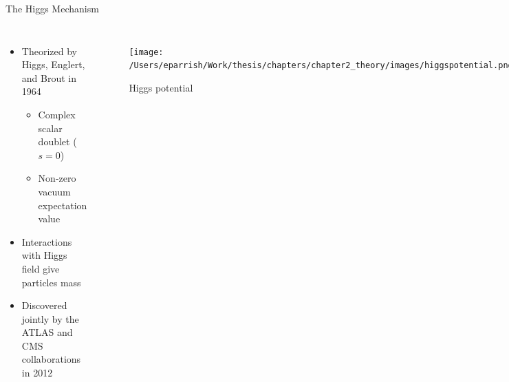 \documentclass[aspectratio=169,xcolor=table]{beamer}
\begin{document}
  \begin{frame}[t]{The Higgs Mechanism}
    \begin{columns}
      \begin{itemize}
        \item Theorized by Higgs, Englert, and Brout in 1964
          \begin{itemize}
            \item Complex scalar doublet ($s=0$)
            \item Non-zero vacuum expectation value
          \end{itemize}
        \item Interactions with Higgs field give particles mass
        \item Discovered jointly by the ATLAS and CMS collaborations in 2012
      \end{itemize}
      \begin{figure}
        \texttt{[image: /Users/eparrish/Work/thesis/chapters/chapter2\_theory/images/higgspotential.png]}
        \caption{\tiny Higgs potential \cite{Higgs-phys}}
      \end{figure}
      \centering
      \begin{figure}
        \texttt{[image: /Users/eparrish/Work/thesis/chapters/chapter2\_theory/images/Higgs\_Discovery\_gam\_gam.jpeg]}
        \caption{\tiny Higgs discovery \cite{higgs-discovery-atlas}}
      \end{figure}
    \end{columns}
  \end{frame}
\end{document}
